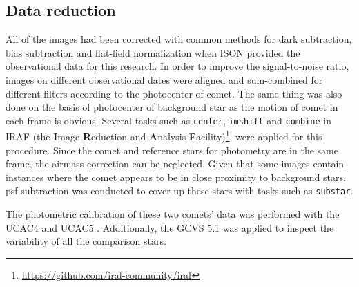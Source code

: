 \subsection{Data reduction}\label{sec:data-reduction}

All of the images had been corrected with common methods for dark subtraction, bias subtraction and flat-field normalization when ISON provided the observational data for this research. In order to improve the signal-to-noise ratio, images on different observational dates were aligned and sum-combined for different filters according to the photocenter of comet. The same thing was also done on the basis of photocenter of background star as the motion of comet in each frame is obvious. Several tasks such as \texttt{center}, \texttt{imshift} and \texttt{combine} in IRAF (the \textbf{I}mage \textbf{R}eduction and \textbf{A}nalysis \textbf{F}acility)\footnote{\url{https://github.com/iraf-community/iraf}}, were applied for this procedure. Since the comet and reference stars for photometry are in the same frame, the airmass correction can be neglected. Given that some images contain instances where the comet appears to be in close proximity to background stars, psf subtraction was conducted to cover up these stars with tasks such as \verb|substar|. 

The photometric calibration of these two comets' data was performed with the UCAC4 \citep{zacharias_fourth_2013} and UCAC5 \citep{zacharias_ucac5_2017}. Additionally, the GCVS 5.1 \citep{samus_general_2017} was applied to inspect the variability of all the comparison stars. 

